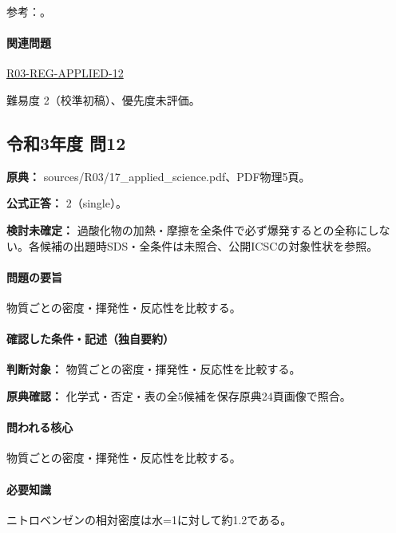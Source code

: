 \par 参考：\cite{organic_nitro,organic_peroxide}。

\paragraph{関連問題} \hyperref[q:r03-reg-applied-12]{R03-REG-APPLIED-12}

\par 難易度 2（校準初稿）、優先度未評価。

\subsection{令和3年度 問12}
\label{q:r03-reg-applied-12}

\noindent\textbf{原典：} sources/R03/17\_applied\_science.pdf、PDF物理5頁。

\textbf{公式正答：} 2（single）。

\par\textbf{検討未確定：} 過酸化物の加熱・摩擦を全条件で必ず爆発するとの全称にしない。各候補の出題時SDS・全条件は未照合、公開ICSCの対象性状を参照。

\paragraph{問題の要旨} 物質ごとの密度・揮発性・反応性を比較する。

\paragraph{確認した条件・記述（独自要約）}\mbox{}\par

\noindent\textbf{判断対象：} 物質ごとの密度・揮発性・反応性を比較する。\par

\noindent\textbf{原典確認：} 化学式・否定・表の全5候補を保存原典24頁画像で照合。\par

\paragraph{問われる核心} 物質ごとの密度・揮発性・反応性を比較する。

\paragraph{必要知識} ニトロベンゼンの相対密度は水=1に対して約1.2である。

